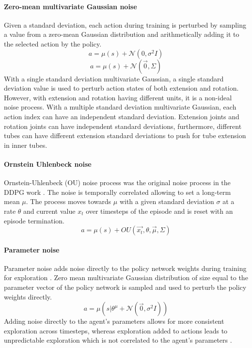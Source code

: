 \paragraph{Zero-mean multivariate Gaussian noise}
Given a standard deviation, each action during training is perturbed by sampling a value from a zero-mean Gaussian distribution and arithmetically adding it to the selected action by the policy.
\begin{equation}
    a = \mu(s) + \mathcal{N} (0, \sigma^2 I)
\end{equation}
\begin{equation}
    a = \mu(s) + \mathcal{N} (\Vec{0}, \Sigma)
\end{equation}
With a single standard deviation multivariate Gaussian, a single standard deviation value is used to perturb action states of both extension and rotation. However, with extension and rotation having different units, it is a non-ideal noise process. With a multiple standard deviation multivariate Gaussian, each action index can have an independent standard deviation. Extension joints and rotation joints can have independent standard deviations, furthermore, different tubes can have different extension standard deviations to push for tube extension in inner tubes.
\paragraph{Ornstein Uhlenbeck noise}
Ornstein-Uhlenbeck (OU) noise process was the original noise process in the DDPG work  \cite{Lillicrap2015}. The noise is temporally correlated allowing to set a long-term mean $\mu$. The process moves towards $\mu$ with a given standard deviation $\sigma$ at a rate $\theta$ and current value $x_t$ over timesteps of the episode and is reset with an episode termination.
\begin{equation}
    a = \mu(s) + OU \left( \Vec{x_{t}}, \theta, \Vec{\mu}, \Sigma \right)
\end{equation}
\paragraph{Parameter noise}
Parameter noise adds noise directly to the policy network weights during training for exploration \cite{plappert2017parameter}. Zero mean multivariate Gaussian distribution of size equal to the parameter vector of the policy network is sampled and used to perturb the policy weights directly.
\begin{equation}
    a = \mu(s | \theta^{\mu} + \mathcal{N} (\Vec{0}, \sigma^2 I)) 
\end{equation}
Adding noise directly to the agent's parameters allows for more consistent exploration across timesteps, whereas exploration added to actions leads to unpredictable exploration which is not correlated to the agent's parameters \cite{plappert2017parameter}.

